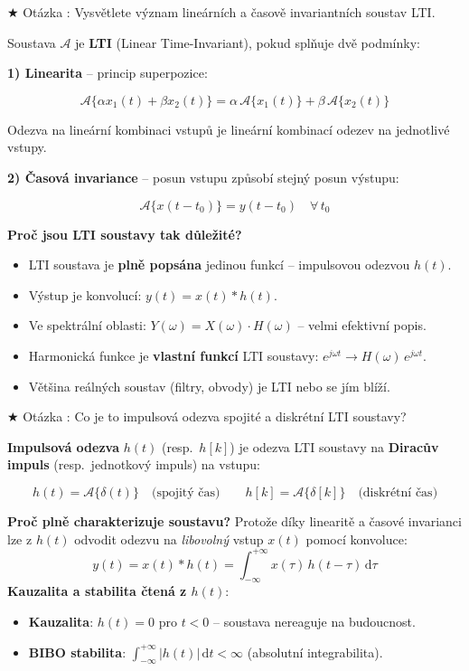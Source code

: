 \documentclass[12pt,a4paper]{article}
\newcommand{\dd}{\mathrm{d}}
\newcounter{otcnt}
\newcommand{\QA}[2]{%
  \stepcounter{otcnt}%
  \begin{Otazka}{}%
    $\bigstar$ Otázka \theotcnt: #1%
  \end{Otazka}%
  \begin{Odpoved}%
    #2%
  \end{Odpoved}%
  \vspace{1em}%
}
\begin{document}
\QA{Vysvětlete význam lineárních a časově invariantních soustav LTI.}{%
  Soustava $\mathcal{A}$ je \textbf{LTI} (Linear Time-Invariant), pokud splňuje dvě podmínky:

  \textbf{1) Linearita} – princip superpozice:
  \begin{Vzorec}[]
  \[
    \mathcal{A}\{\alpha x_1(t) + \beta x_2(t)\} = \alpha\,\mathcal{A}\{x_1(t)\} + \beta\,\mathcal{A}\{x_2(t)\}
  \]
  \end{Vzorec}
  Odezva na lineární kombinaci vstupů je lineární kombinací odezev na jednotlivé vstupy.

  \textbf{2) Časová invariance} – posun vstupu způsobí stejný posun výstupu:
  \begin{Vzorec}[]
  \[
    \mathcal{A}\{x(t-t_0)\} = y(t-t_0) \quad \forall\, t_0
  \]
  \end{Vzorec}
  \textbf{Proč jsou LTI soustavy tak důležité?}
  \begin{itemize}[itemsep=3pt]
    \item LTI soustava je \textbf{plně popsána} jedinou funkcí – impulsovou odezvou $h(t)$.
    \item Výstup je konvolucí: $y(t) = x(t) * h(t)$.
    \item Ve spektrální oblasti: $Y(\omega) = X(\omega)\cdot H(\omega)$ – velmi efektivní popis.
    \item Harmonická funkce je \textbf{vlastní funkcí} LTI soustavy: $e^{j\omega t} \to H(\omega)\,e^{j\omega t}$.
    \item Většina reálných soustav (filtry, obvody) je LTI nebo se jím blíží.
  \end{itemize}
}

\QA{Co je to impulsová odezva spojité a diskrétní LTI soustavy?}{%
  \textbf{Impulsová odezva} $h(t)$ (resp.\ $h[k]$) je odezva LTI soustavy na \textbf{Diracův impuls} (resp.\ jednotkový impuls) na vstupu:
  \begin{Vzorec}[]
  \[
    h(t) = \mathcal{A}\{\delta(t)\} \quad \text{(spojitý čas)}
    \qquad
    h[k] = \mathcal{A}\{\delta[k]\} \quad \text{(diskrétní čas)}
  \]
  \end{Vzorec}
  \textbf{Proč plně charakterizuje soustavu?} Protože díky linearitě a časové invarianci lze z $h(t)$ odvodit odezvu na \textit{libovolný} vstup $x(t)$ pomocí konvoluce:
  \[
    y(t) = x(t) * h(t) = \int_{-\infty}^{+\infty} x(\tau)\,h(t-\tau)\,\dd\tau
  \]
  \textbf{Kauzalita a stabilita čtená z $h(t)$}:
  \begin{itemize}[itemsep=3pt]
    \item \textbf{Kauzalita}: $h(t) = 0$ pro $t < 0$ – soustava nereaguje na budoucnost.
    \item \textbf{BIBO stabilita}: $\int_{-\infty}^{+\infty}|h(t)|\,\dd t < \infty$ (absolutní integrabilita).
  \end{itemize}
}
\end{document}
